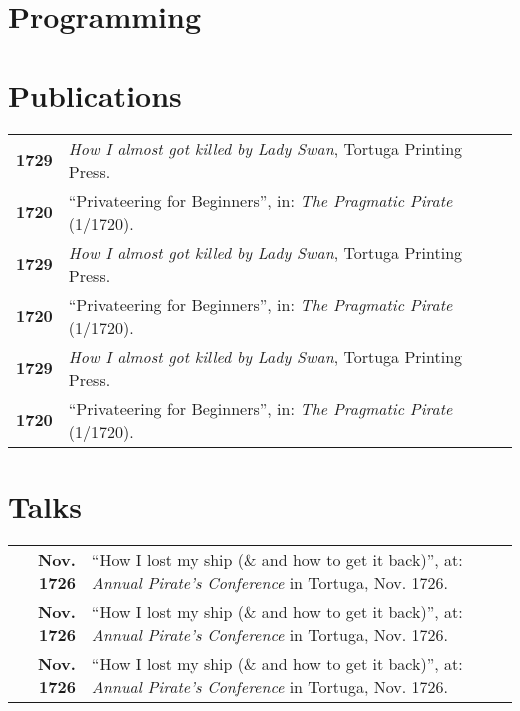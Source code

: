 \documentclass{modernsimplecv}
\newlength{\rightcolwidth}
\begin{document}
\begin{paracol}{2}
\section{Programming}
{\small
\lipsum[20]

}
\bigskip

\begin{skillsection}{\rightcolwidth}
\end{skillsection}


\bigskip



\vspace{4em}


\begin{minipage}[t]{\rightcolwidth}
\section*{Publications}
\begin{tabular}{>{\footnotesize\bfseries}r >{\footnotesize}p{}}
    1729 & \emph{How I almost got killed by Lady Swan}, Tortuga Printing Press. \\
    1720 & ``Privateering for Beginners'', in: \emph{The Pragmatic Pirate} (1/1720).\\
    1729 & \emph{How I almost got killed by Lady Swan}, Tortuga Printing Press. \\
    1720 & ``Privateering for Beginners'', in: \emph{The Pragmatic Pirate} (1/1720).\\
    1729 & \emph{How I almost got killed by Lady Swan}, Tortuga Printing Press. \\
    1720 & ``Privateering for Beginners'', in: \emph{The Pragmatic Pirate} (1/1720).
\end{tabular}
\bigskip

\section*{Talks}
\begin{tabular}{>{\footnotesize\bfseries}r >{\footnotesize}p{}}
    Nov. 1726 & ``How I lost my ship (\& and how to get it back)'', at: \emph{Annual Pirate's Conference} in Tortuga, Nov. 1726. \\
    Nov. 1726 & ``How I lost my ship (\& and how to get it back)'', at: \emph{Annual Pirate's Conference} in Tortuga, Nov. 1726. \\
    Nov. 1726 & ``How I lost my ship (\& and how to get it back)'', at: \emph{Annual Pirate's Conference} in Tortuga, Nov. 1726.
\end{tabular}
\end{minipage}









\end{paracol}
\end{document}
